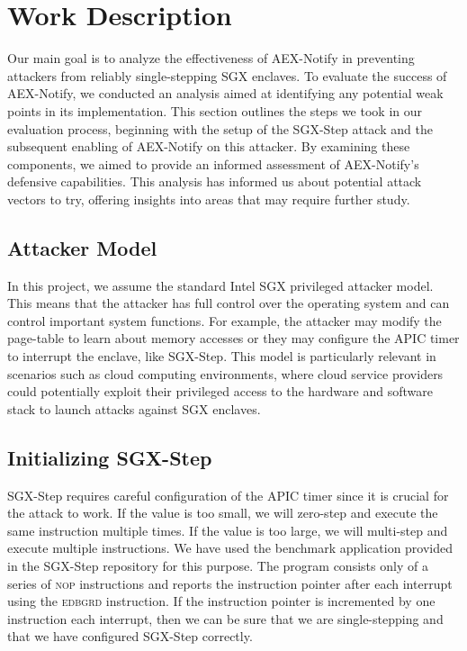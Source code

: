 \documentclass{llncs}
\begin{document}
\section{Work Description}

Our main goal is to analyze the effectiveness of AEX-Notify
in preventing attackers from reliably single-stepping SGX enclaves.
To evaluate the success of AEX-Notify,
we conducted an analysis aimed at identifying any potential weak points in its implementation.
This section outlines the steps we took in our evaluation process,
beginning with the setup of the SGX-Step attack and
the subsequent enabling of AEX-Notify on this attacker.
By examining these components,
we aimed to provide an informed assessment of AEX-Notify’s defensive capabilities.
This analysis has informed us about potential attack vectors to try,
offering insights into areas that may require further study.

\subsection{Attacker Model}

In this project, we assume the standard Intel SGX privileged attacker model.
This means that the attacker has full control over the operating system
and can control important system functions.
For example, the attacker may modify the page-table to learn about memory accesses
or they may configure the APIC timer to interrupt the enclave, like SGX-Step.
This model is particularly relevant in scenarios such as cloud computing
environments, where cloud service providers could potentially exploit their
privileged access to the hardware and software stack to launch attacks against SGX enclaves.

\subsection{Initializing SGX-Step}


SGX-Step requires careful configuration of the APIC timer
since it is crucial for the attack to work.
If the value is too small, we will zero-step and execute the same instruction multiple times.
If the value is too large, we will multi-step and execute multiple instructions.
We have used the benchmark application provided in the SGX-Step repository for this purpose.
The program consists only of a series of \textsc{nop} instructions and
reports the instruction pointer after each interrupt using the \textsc{edbgrd} instruction.
If the instruction pointer is incremented by one instruction each interrupt,
then we can be sure that we are single-stepping and
that we have configured SGX-Step correctly.
\end{document}
